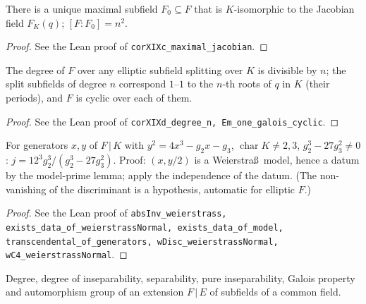 \begin{corollary}
\label{cor:XIXc}
\leanok
There is a unique maximal subfield $F_0\subseteq F$ that is $K$-isomorphic to the Jacobian field $F_K(q)$; $[F:F_0]=n^2$.
\end{corollary}
\begin{proof}
\leanok
See the Lean proof of \texttt{corXIXc\_maximal\_jacobian}.
\end{proof}

\begin{corollary}
\label{cor:XIXd}
\leanok
The degree of $F$ over any elliptic subfield splitting over $K$ is divisible by $n$; the split subfields of degree $n$ correspond $1$--$1$ to the $n$-th roots of $q$ in $K$ (their periods), and $F$ is cyclic over each of them.
\end{corollary}
\begin{proof}
\leanok
See the Lean proof of \texttt{corXIXd\_degree\_n, Em\_one\_galois\_cyclic}.
\end{proof}

\begin{proposition}
\label{prop:absinv-weierstrass}
\leanok
For generators $x,y$ of $F\,|\,K$ with $y^2=4x^3-g_2x-g_3$, $\operatorname{char}K\ne2,3$, $g_2^3-27g_3^2\ne0$: $j=12^3g_2^3/(g_2^3-27g_3^2)$. Proof: $(x,y/2)$ is a Weierstra\ss\ model, hence a datum by the model-prime lemma; apply the independence of the datum. (The non-vanishing of the discriminant is a hypothesis, automatic for elliptic $F$.)
\end{proposition}
\begin{proof}
\leanok
See the Lean proof of \texttt{absInv\_weierstrass, exists\_data\_of\_weierstrassNormal, exists\_data\_of\_model, transcendental\_of\_generators, wDisc\_weierstrassNormal, wC4\_weierstrassNormal}.
\end{proof}

\begin{definition}
\label{def:rel-degree}
\leanok
Degree, degree of inseparability, separability, pure inseparability, Galois property and automorphism group of an extension $F\,|\,E$ of subfields of a common field.
\end{definition}

